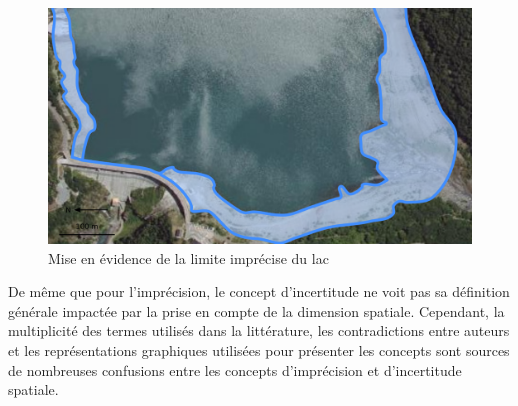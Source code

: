 \begin{figure}
  \centering
  \includegraphics{../figures/fig3.png}
  \caption{Mise en évidence de la limite imprécise du lac}
  \label{fig:lim_champ_imp}
\end{figure}

De même que pour l’imprécision, le concept d’incertitude ne voit pas
sa définition générale impactée par la prise en compte de la dimension
spatiale. Cependant, la multiplicité des termes utilisés dans la
littérature, les contradictions entre auteurs et les représentations
graphiques utilisées pour présenter les concepts sont sources de
nombreuses confusions entre les concepts d’imprécision et
d’incertitude spatiale.

